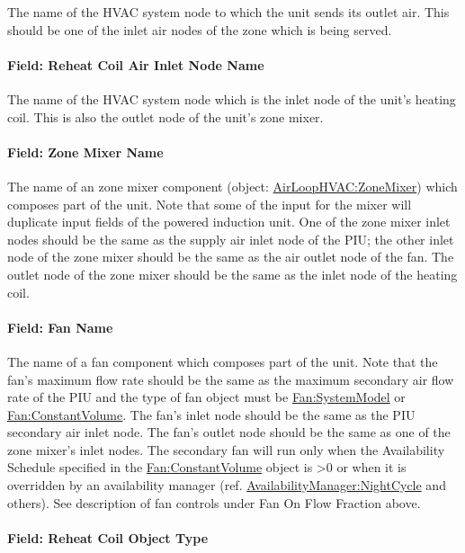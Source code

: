 The name of the HVAC system node to which the unit sends its outlet air. This should be one of the inlet air nodes of the zone which is being served.

\paragraph{Field: Reheat Coil Air Inlet Node Name}\label{field-reheat-coil-air-inlet-node-name-1}

The name of the HVAC system node which is the inlet node of the unit's heating coil. This is also the outlet node of the unit's zone mixer.

\paragraph{Field: Zone Mixer Name}\label{field-zone-mixer-name-1}

The name of an zone mixer component (object: \hyperref[airloophvaczonemixer]{AirLoopHVAC:ZoneMixer}) which composes part of the unit. Note that some of the input for the mixer will duplicate input fields of the powered induction unit. One of the zone mixer inlet nodes should be the same as the supply air inlet node of the PIU; the other inlet node of the zone mixer should be the same as the air outlet node of the fan. The outlet node of the zone mixer should be the same as the inlet node of the heating coil.

\paragraph{Field: Fan Name}\label{field-fan-name-2}

The name of a fan component which composes part of the unit. Note that the fan's maximum flow rate should be the same as the maximum secondary air flow rate of the PIU and the type of fan object must be \hyperref[fansystemmodel]{Fan:SystemModel} or \hyperref[fanconstantvolume]{Fan:ConstantVolume}. The fan's inlet node should be the same as the PIU secondary air inlet node. The fan's outlet node should be the same as one of the zone mixer's inlet nodes. The secondary fan will run only when the Availability Schedule specified in the \hyperref[fanconstantvolume]{Fan:ConstantVolume} object is >0 or when it is overridden by an availability manager (ref. \hyperref[availabilitymanagernightcycle]{AvailabilityManager:NightCycle} and others). See description of fan controls under Fan On Flow Fraction above.

\paragraph{Field: Reheat Coil Object Type}\label{field-reheat-coil-object-type-4}

